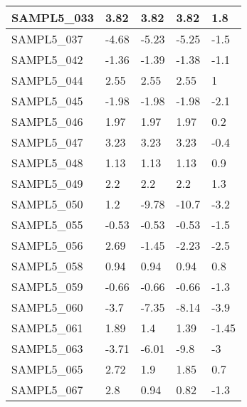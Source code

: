 \documentclass{article}
\begin{document}
\begin{table}[]
\begin{tabular}{|l|l|l|l|l|}
SAMPL5\_033 & 3.82     & 3.82           & 3.82                     & 1.8                     \\ \hline
SAMPL5\_037 & -4.68    & -5.23          & -5.25                    & -1.5                    \\ \hline
SAMPL5\_042 & -1.36    & -1.39          & -1.38                    & -1.1                    \\ \hline
SAMPL5\_044 & 2.55     & 2.55           & 2.55                     & 1                       \\ \hline
SAMPL5\_045 & -1.98    & -1.98          & -1.98                    & -2.1                    \\ \hline
SAMPL5\_046 & 1.97     & 1.97           & 1.97                     & 0.2                     \\ \hline
SAMPL5\_047 & 3.23     & 3.23           & 3.23                     & -0.4                    \\ \hline
SAMPL5\_048 & 1.13     & 1.13           & 1.13                     & 0.9                     \\ \hline
SAMPL5\_049 & 2.2      & 2.2            & 2.2                      & 1.3                     \\ \hline
SAMPL5\_050 & 1.2      & -9.78          & -10.7                    & -3.2                    \\ \hline
SAMPL5\_055 & -0.53    & -0.53          & -0.53                    & -1.5                    \\ \hline
SAMPL5\_056 & 2.69     & -1.45          & -2.23                    & -2.5                    \\ \hline
SAMPL5\_058 & 0.94     & 0.94           & 0.94                     & 0.8                     \\ \hline
SAMPL5\_059 & -0.66    & -0.66          & -0.66                    & -1.3                    \\ \hline
SAMPL5\_060 & -3.7     & -7.35          & -8.14                    & -3.9                    \\ \hline
SAMPL5\_061 & 1.89     & 1.4            & 1.39                     & -1.45                   \\ \hline
SAMPL5\_063 & -3.71    & -6.01          & -9.8                     & -3                      \\ \hline
SAMPL5\_065 & 2.72     & 1.9            & 1.85                     & 0.7                     \\ \hline
SAMPL5\_067 & 2.8      & 0.94           & 0.82                     & -1.3                    \\ \hline

\end{tabular}
\end{table}
\end{document}
